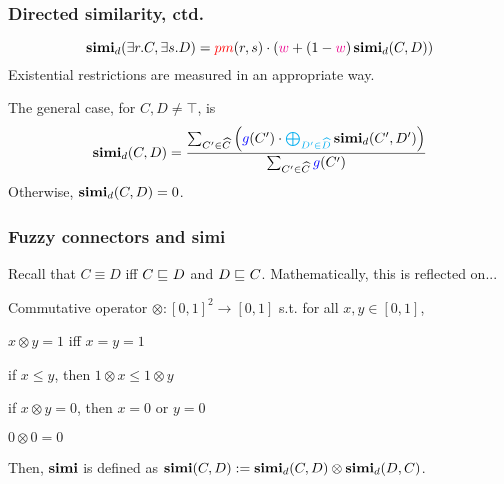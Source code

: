 \documentclass{beamer}
\begin{document}
\begin{frame}
  \frametitle{Directed similarity, ctd.}
  \begin{equation}
    \operatorname{\mathbf{simi}}_d(\exists{}r.C,\exists{}s.D) =
    \textcolor{red}{pm}(r,s) \cdot 
    \left(\textcolor{magenta}{w} + 
    (1-\textcolor{magenta}{w})\operatorname{\mathbf{simi}}_d(C,D)\right)
  \end{equation}
  Existential restrictions are measured in an
  appropriate way.

  The general case, for \(C,D \ne \top\), is
  \begin{equation}
    \simi_d(C,D) =
    \frac{\sum_{C^\prime \in \widehat{C}}\left(\textcolor{blue}{g}(C^\prime) \cdot \textcolor{cyan}{\bigoplus_{D^\prime \in \widehat{D}}} \simi_d(C^\prime, D^\prime)\right)}%
    {\sum_{C^\prime \in \widehat{C}}\textcolor{blue}{g}(C^\prime)}
  \end{equation}
  Otherwise, \(\operatorname{\mathbf{simi}}_d(C,D) = 0\).
\end{frame}

\begin{frame}
  \frametitle{Fuzzy connectors and simi}
  Recall that \(C \equiv D\) iff \(C \sqsubseteq_{\mathcal{}} D\)
  and \(D \sqsubseteq_{\mathcal{}} C\).
  Mathematically, this is reflected on...
  \begin{definition}
    Commutative operator
    \(\otimes \colon%
    {[0,1]}^2 \to [0,1]\) s.t. for all
    \(x, y \in [0,1]\),
    \begin{description}[<+->]
      \item[Equivalence closed]\label{fu:1}
      \(x \otimes y = 1\) iff \(x = y = 1\)
      \item[Weak monotonic]\label{fu:2}
      if \(x \le y\), then
      \(1 \otimes x \le 1 \otimes y\) 
      \item[Bounded]\label{fu:3}
      if \(x \otimes y = 0\), then
      \(x = 0\) or \(y = 0\)
      \item[Grounded]\label{fu:4}
      \(0 \otimes 0 = 0\)
    \end{description}
  \end{definition}
  Then, \(\operatorname{\mathbf{simi}}\) is defined as
\(\operatorname{\mathbf{simi}}(C,D) := \operatorname{\mathbf{simi}}_d(C,D) \otimes \operatorname{\mathbf{simi}}_d(D,C)\).
\end{frame}
\end{document}
